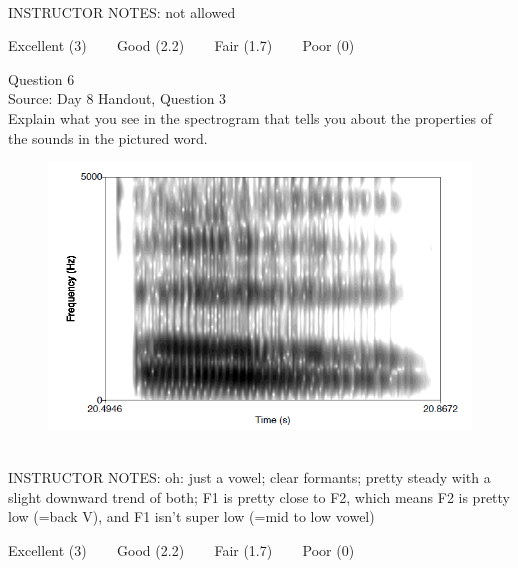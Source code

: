 \documentclass[12pt]{article}
\begin{document}
~\\
INSTRUCTOR NOTES: not allowed


\vfill
Excellent (3) ~~~ Good (2.2) ~~~ Fair (1.7) ~~~ Poor (0)
\newpage

{\large Question 6}\\

Source: Day 8 Handout, Question 3\\

Explain what you see in the spectrogram that tells you about the properties of the sounds in the pictured word.\\

\begin{figure}[H]
\includegraphics{../images/spectrogram_oh.png}
\end{figure}

~\\
INSTRUCTOR NOTES: oh: just a vowel; clear formants; pretty steady with a slight downward trend of both; F1 is pretty close to F2, which means F2 is pretty low (=back V), and F1 isn't super low (=mid to low vowel)


\vfill
Excellent (3) ~~~ Good (2.2) ~~~ Fair (1.7) ~~~ Poor (0)
\newpage

\begin{center}
\textbf{{\color{red}{\HUGE END OF EXAM}}}\\

\end{center}
\newpage

\begin{center}
\textbf{{\color{blue}{\HUGE START OF EXAM\\}}}

\textbf{{\color{blue}{\HUGE Student ID: 9450\\}}}

\textbf{{\color{blue}{\HUGE 11:10 - 11:30 AM\\}}}

\end{center}
\newpage
\end{document}
